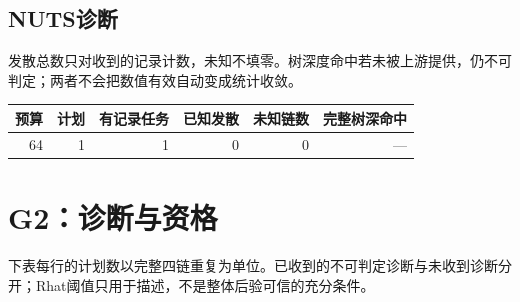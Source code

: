 \documentclass[UTF8,fontset=fandol,a4paper]{ctexart}
\begin{document}
\subsection*{NUTS诊断}
发散总数只对收到的记录计数，未知不填零。树深度命中若未被上游提供，仍不可判定；两者不会把数值有效自动变成统计收敛。
\begin{longtable}{rrrrrr}
\toprule 预算 & 计划 & 有记录任务 & 已知发散 & 未知链数 & 完整树深命中 \\ \midrule\endhead
64 & 1 & 1 & 0 & 0 & — \\
\bottomrule\end{longtable}
\clearpage\section*{G2：诊断与资格}
下表每行的计划数以完整四链重复为单位。已收到的不可判定诊断与未收到诊断分开；Rhat阈值只用于描述，不是整体后验可信的充分条件。
\end{document}
